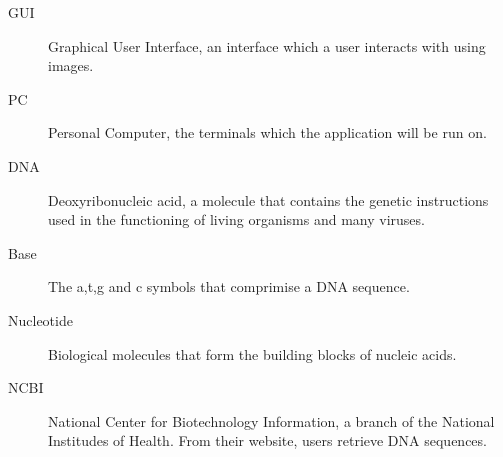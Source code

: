 \begin{description}
\item[GUI] {Graphical User Interface, an interface which a user interacts with using images.}

\item [PC] {Personal Computer, the terminals which the application will be run on.}

\item [DNA] {Deoxyribonucleic acid, a molecule that contains the genetic instructions used in the functioning of living organisms and many viruses.}

\item [Base] {The a,t,g and c symbols that comprimise a DNA sequence.}

\item [Nucleotide] {Biological molecules that form the building blocks of nucleic acids.}

\item [NCBI] {National Center for Biotechnology Information, a branch of the National Institudes of Health. From their website, users retrieve DNA sequences.}
\end{description}
